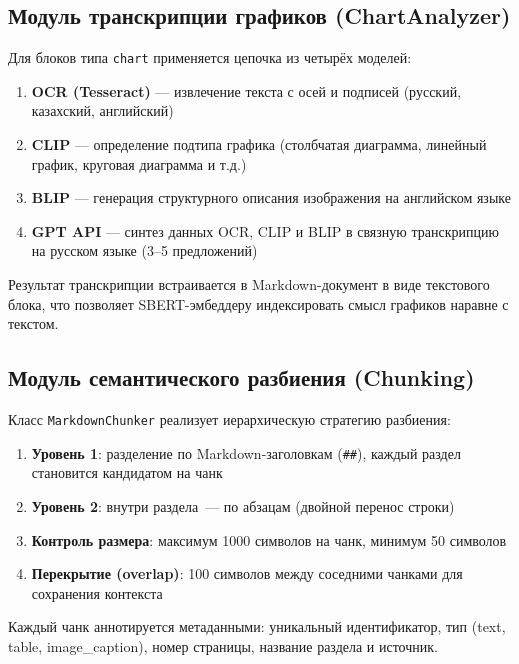 \documentclass[a4paper,12pt]{article}
\begin{document}
\subsection{Модуль транскрипции графиков (ChartAnalyzer)}

Для блоков типа \texttt{chart} применяется цепочка из четырёх моделей:

\begin{enumerate}
    \item \textbf{OCR (Tesseract)} --- извлечение текста с осей и подписей (русский, казахский, английский)
    \item \textbf{CLIP} --- определение подтипа графика (столбчатая диаграмма, линейный график, круговая диаграмма и т.д.)
    \item \textbf{BLIP} --- генерация структурного описания изображения на английском языке
    \item \textbf{GPT API} --- синтез данных OCR, CLIP и BLIP в связную транскрипцию на русском языке (3--5 предложений)
\end{enumerate}

Результат транскрипции встраивается в Markdown-документ в виде текстового блока, что позволяет SBERT-эмбеддеру индексировать смысл графиков наравне с текстом.

\subsection{Модуль семантического разбиения (Chunking)}

Класс \texttt{MarkdownChunker} реализует иерархическую стратегию разбиения:

\begin{enumerate}
    \item \textbf{Уровень 1}: разделение по Markdown-заголовкам (\texttt{\#\#}), каждый раздел становится кандидатом на чанк
    \item \textbf{Уровень 2}: внутри раздела~--- по абзацам (двойной перенос строки)
    \item \textbf{Контроль размера}: максимум 1000 символов на чанк, минимум 50 символов
    \item \textbf{Перекрытие (overlap)}: 100 символов между соседними чанками для сохранения контекста
\end{enumerate}

Каждый чанк аннотируется метаданными: уникальный идентификатор, тип (text, table, image\_caption), номер страницы, название раздела и источник.
\end{document}
